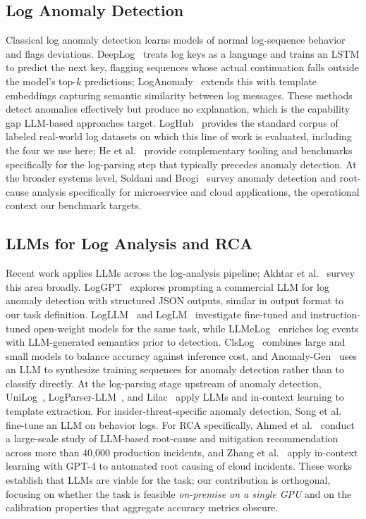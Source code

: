 \documentclass[10pt,conference]{IEEEtran}
\begin{document}
\subsection{Log Anomaly Detection}
Classical log anomaly detection learns models of normal log-sequence
behavior and flags deviations. DeepLog~\cite{deeplog2017} treats log keys
as a language and trains an LSTM to predict the next key, flagging
sequences whose actual continuation falls outside the model's top-$k$
predictions; LogAnomaly~\cite{loganomaly2019} extends this with template
embeddings capturing semantic similarity between log messages. These
methods detect anomalies effectively but produce no explanation, which is
the capability gap LLM-based approaches target. LogHub~\cite{loghub}
provides the standard corpus of labeled real-world log datasets on which
this line of work is evaluated, including the four we use here; He et
al.~\cite{loglizer} provide complementary tooling and benchmarks
specifically for the log-parsing step that typically precedes anomaly
detection. At the
broader systems level, Soldani and Brogi~\cite{soldani2022rca} survey
anomaly detection and root-cause analysis specifically for microservice
and cloud applications, the operational context our benchmark targets.

\subsection{LLMs for Log Analysis and RCA}
Recent work applies LLMs across the log-analysis pipeline; Akhtar et
al.~\cite{llmeventlogsurvey2025} survey this area broadly.
LogGPT~\cite{loggpt2023} explores prompting a commercial LLM for log
anomaly detection with structured JSON outputs, similar in output format
to our task definition. LogLLM~\cite{logllm2024} and
LogLM~\cite{liu2024loglm} investigate fine-tuned and instruction-tuned
open-weight models for the same task, while LLMeLog~\cite{he2024llmelog}
enriches log events with LLM-generated semantics prior to detection.
ClsLog~\cite{xiao2025clslog} combines large and small models to balance
accuracy against inference cost, and Anomaly-Gen~\cite{li2025anomalygen}
uses an LLM to synthesize training sequences for anomaly detection rather
than to classify directly. At the log-parsing stage upstream of anomaly
detection, UniLog~\cite{xu2024unilog}, LogParser-LLM~\cite{zhong2024logparserllm},
and Lilac~\cite{jiang2024lilac} apply LLMs and in-context learning to
template extraction. For insider-threat-specific anomaly detection,
Song et al.~\cite{song2025confront} fine-tune an LLM on behavior logs.
For RCA specifically, Ahmed et al.~\cite{ahmed2023recommending} conduct a
large-scale study of LLM-based root-cause and mitigation recommendation
across more than 40{,}000 production incidents, and Zhang et
al.~\cite{gpt4rca2024} apply in-context learning with GPT-4 to automated
root causing of cloud incidents. These works establish that LLMs are
viable for the task; our contribution is orthogonal, focusing on whether
the task is feasible \emph{on-premise on a single GPU} and on the
calibration properties that aggregate accuracy metrics obscure.
\end{document}
